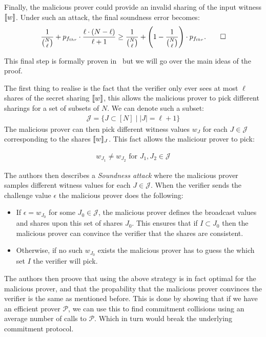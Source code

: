 \documentclass[11pt]{report}
\theoremstyle{definition}
\theoremstyle{plain}
\begin{document}
Finally, the malicious prover could provide an invalid sharing of the input witness $ \llbracket w \rrbracket $. Under such an attack, the final soundness error becomes:
\begin{align*}
  \frac{1}{\binom{N}{\ell}} + p_{f_{thr}} \cdot \frac{\ell \cdot (N - \ell)}{\ell + 1} \geq \frac{1}{\binom{N}{\ell}} + \left(1 - \frac{1}{\binom{N}{\ell}}\right) \cdot p_{f_{thr}}. \qed
\end{align*}

This final step is formally proven in~\cite[p20]{feneuil2023threshold} but we will go over the main ideas of the proof.

The first thing to realise is the fact that the verifier only ever sees at most $\ell$ shares of the secret sharing $\llbracket w \rrbracket$, this allows the malicious prover to pick different sharings for a set of subsets of $N$.
We can denote such a subset:
\begin{align}
  \mathcal{J} = \{J \subset [N] \mid |J| = \ell + 1\}
\end{align}
The malicious prover can then pick different witness values $w_J$ for each $J \in \mathcal{J}$ corresponding to the shares $\llbracket w \rrbracket_J$.
This fact allows the maliciour prover to pick:

\begin{align}
  w_{J_1} \neq w_{J_2} \text{ for } J_1, J_2 \in \mathcal{J}
\end{align}

The authors then describes a \textit{Soundness attack} where the malicious prover samples different witness values for each $J \in \mathcal{J}$. When the verifier sends the challenge value $\epsilon$ the malicious prover does the following:
\begin{itemize}
  \item If $\epsilon = w_{J_0}$ for some $J_0 \in \mathcal{J}$, the malicious prover defines the broadcast values and shares upon this set of shares $J_0$. This ensures that if $I \subset J_0$ then the malicious prover can convince the verifier that the shares are consistent.
  \item Otherwise, if no such $w_{J_0}$ exists the malicious prover has to guess the which set $I$ the verifier will pick.
\end{itemize}

The authors then proove that using the above strategy is in fact optimal for the malicious prover, and that the propability that the malicious prover convinces the verifier is the same as mentioned before. This is done by showing that if we have an efficient prover $\mathcal{P}$, we can use this to find commitment collisions using an average number of calls to $\mathcal{P}$. Which in turn would break the underlying commitment protocol.
\end{document}
